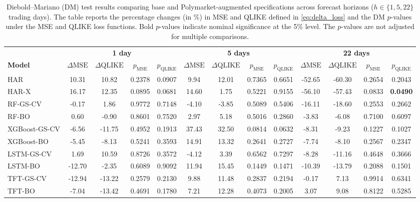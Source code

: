 \begin{table}[!h]
\centering
\scriptsize
\setlength{\tabcolsep}{1.5pt}
\caption{Diebold--Mariano (DM) test results comparing base and Polymarket-augmented specifications across forecast horizons ($h \in \{1,5,22\}$ trading days). The table reports the percentage changes (in \%) in MSE and QLIKE defined in \eqref{eq:delta_loss} and the DM $p$-values under the MSE and QLIKE loss functions. Bold $p$-values indicate nominal significance at the 5\% level. The $p$-values are not adjusted for multiple comparisons.}
\label{tab:dm_test}
\begin{tabular*}{\linewidth}{@{\extracolsep{\fill}} l cccc cccc cccc @{}}
\toprule
& \multicolumn{4}{c}{\textbf{1 day}} & \multicolumn{4}{c}{\textbf{5 days}} & \multicolumn{4}{c}{\textbf{22 days}} \\
\cmidrule(lr){2-5} \cmidrule(lr){6-9} \cmidrule(lr){10-13}
\textbf{Model} & $\Delta\text{MSE}$ & $\Delta\text{QLIKE}$ & $p_{\text{MSE}}$ & $p_{\text{QLIKE}}$ & $\Delta\text{MSE}$ & $\Delta\text{QLIKE}$ & $p_{\text{MSE}}$ & $p_{\text{QLIKE}}$ & $\Delta\text{MSE}$ & $\Delta\text{QLIKE}$ & $p_{\text{MSE}}$ & $p_{\text{QLIKE}}$ \\
\midrule
HAR & 10.31 & 10.82 & 0.2378 & 0.0907 & 9.94 & 12.01 & 0.7365 & 0.6651 & -52.65 & -60.30 & 0.2654 & 0.2043 \\
HAR-X & 16.17 & 12.35 & 0.0895 & 0.0681 & 14.60 & 1.75 & 0.5221 & 0.9155 & -56.10 & -57.43 & 0.0833 & \textbf{0.0490} \\
RF-GS-CV & -0.17 & 1.86 & 0.9772 & 0.7148 & -4.10 & -3.85 & 0.5089 & 0.5406 & -16.11 & -18.60 & 0.2553 & 0.2662 \\
RF-BO & 0.60 & -0.90 & 0.8601 & 0.7520 & 2.97 & 5.18 & 0.5016 & 0.2860 & -3.83 & -6.08 & 0.7100 & 0.6097 \\
XGBoost-GS-CV & -6.56 & -11.75 & 0.4952 & 0.1913 & 37.43 & 32.50 & 0.0814 & 0.0632 & -8.31 & -9.23 & 0.1227 & 0.1027 \\
XGBoost-BO & -5.45 & -8.13 & 0.5241 & 0.3593 & 14.91 & 13.32 & 0.2641 & 0.2727 & -7.74 & -8.10 & 0.2567 & 0.2347 \\
LSTM-GS-CV & 1.69 & 10.59 & 0.8726 & 0.3572 & -4.12 & 3.39 & 0.6562 & 0.7297 & -8.28 & -11.16 & 0.4648 & 0.3666 \\
LSTM-BO & -12.70 & -2.35 & 0.6089 & 0.9092 & 11.94 & 15.45 & 0.1449 & 0.1471 & -10.39 & -13.79 & 0.2088 & 0.1501 \\
TFT-GS-CV & -12.94 & -13.22 & 0.2579 & 0.2130 & 9.88 & 11.48 & 0.2837 & 0.2194 & -0.17 & 7.13 & 0.9914 & 0.6341 \\
TFT-BO & -7.04 & -13.42 & 0.4691 & 0.1780 & 7.21 & 12.28 & 0.4073 & 0.2005 & 3.07 & 9.08 & 0.8122 & 0.5285 \\
\bottomrule
\end{tabular*}
\end{table}

